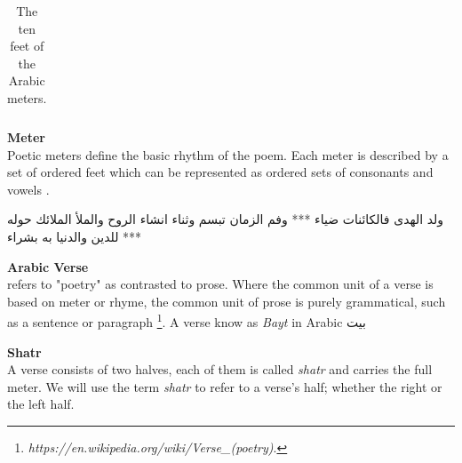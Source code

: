 \begin{savenotes}
\begin{table}[H]
\begin{tabular}{|c|c|c|c|}
    \hline
  \end{tabular}
  \caption{The ten feet of the Arabic meters. }\label{arud:feet}
\end{table}
    \end{savenotes}


    \newpage
\begin{definition}\label{def:meter}
  \textbf{Meter} \hfill \\
  Poetic meters define the basic rhythm of the poem. Each meter is described by a set of ordered feet which can
be represented as ordered sets of consonants and vowels \cite{Almuhareb2015}.


\begin{Arabic}
	\begin{traditionalpoem*}
          ولد الهدى فالكائنات ضياء *** وفم الزمان تبسم وثناء انشاء
          الروح والملأ الملائك حوله *** للدين والدنيا به بشراء

	\end{traditionalpoem*}
\end{Arabic}%



\end{definition}


\begin{definition}\label{def:verse}
  \textbf{Arabic Verse} \hfill \\ refers to "poetry" as contrasted to prose. Where the common unit of a verse is based on meter or rhyme, the common unit of prose is purely grammatical, such as a sentence or paragraph \footnote{\textit{ https://en.wikipedia.org/wiki/Verse\_(poetry)}.}. A verse know as \textit{Bayt} in Arabic \textarabic{بيت}

\end{definition}


\begin{definition}\label{def:shatr}
  \textbf{Shatr} \hfill \\  A verse consists of two halves, each of them is called \textit{shatr} and carries the full meter.  We will use the term \textit{shatr} to refer to a verse's half; whether the right or the left half.
\end{definition}



